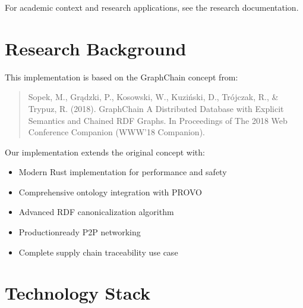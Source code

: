 \documentclass[letterpaper,10pt,english]{sphinxmanual}
\begin{document}
\sphinxAtStartPar
For academic context and research applications, see the research documentation.


\chapter{Research Background}
\label{\detokenize{index:research-background}}
\sphinxAtStartPar
This implementation is based on the GraphChain concept from:
\begin{quote}

\sphinxAtStartPar
Sopek, M., Grądzki, P., Kosowski, W., Kuziński, D., Trójczak, R., \& Trypuz, R. (2018).
GraphChain \textendash{} A Distributed Database with Explicit Semantics and Chained RDF Graphs.
In Proceedings of The 2018 Web Conference Companion (WWW’18 Companion).
\end{quote}

\sphinxAtStartPar
Our implementation extends the original concept with:
\begin{itemize}
\item {} 
\sphinxAtStartPar
Modern Rust implementation for performance and safety

\item {} 
\sphinxAtStartPar
Comprehensive ontology integration with PROV\sphinxhyphen{}O

\item {} 
\sphinxAtStartPar
Advanced RDF canonicalization algorithm

\item {} 
\sphinxAtStartPar
Production\sphinxhyphen{}ready P2P networking

\item {} 
\sphinxAtStartPar
Complete supply chain traceability use case

\end{itemize}


\chapter{Technology Stack}
\label{\detokenize{index:technology-stack}}
\end{document}
